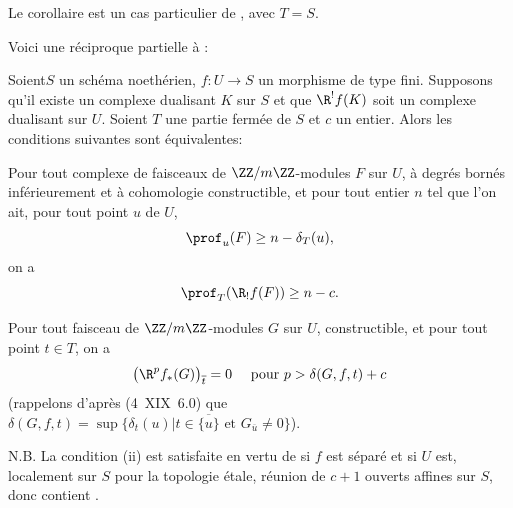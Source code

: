 Le corollaire est un cas particulier de , avec $T=S$.

Voici une r\'eciproque partielle \`a :

\begin{proposition} \label{XIV.4.7}
Soient\pageoriginale $S$ un sch\'ema noeth\'erien, $f\colon U\to S$ un morphisme de type fini. Supposons qu'il existe un complexe dualisant $K$ sur $S$ et que $\R^{!}f(K)$ soit un complexe dualisant sur $U$. Soient $T$ une partie ferm\'ee de $S$ et $c$ un entier. Alors les conditions suivantes sont \'equivalentes:
\begin{enumeratei}
\item
Pour tout complexe de faisceaux de $\ZZ/m\ZZ$-modules $F$ sur $U$, \`a degr\'es born\'es inf\'erieurement et \`a cohomologie constructible, et pour tout entier $n$ tel que l'on ait, pour tout point $u$ de $U$,
$$
\prof_{u}(F)\geq n-\delta_{T}(u),
$$
on a
$$
\prof_{T}(\R_{!}f(F))\geq n-c.
$$

\item
Pour tout faisceau de $\ZZ/m\ZZ$-modules $G$ sur $U$, constructible, et pour tout point $t\in T$, on a
$$
\big(\R^{p}f_{\ast}(G)\big)_{\overline{t}}=0\quad\textrm{ pour }p>\delta(G, f, t)+c$$
(rappelons d'apr\`es (\textup{\SGA {}4~XIX~6.0}) que $\delta(G, f, t)=\sup\{ \delta_{t}(u)|t\in\overline{\{ u\} }\textrm{ et }G_{\overline{u}}\neq 0\}$).
\end{enumeratei}
\end{proposition}

N.B. La condition \textup{(ii)} est satisfaite en vertu de  si $f$ est s\'epar\'e et si $U$ est, localement sur $S$ pour la topologie \'etale, r\'eunion de $c+1$ ouverts affines sur $S$, donc  contient .

